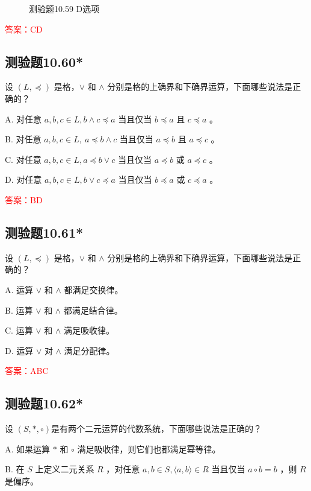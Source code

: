 \documentclass[UTF8, heading=true]{ctexart}
\begin{document}
\begin{figure}[H]
\begin{minipage}[t]{0.2\textwidth}
      \vspace{-0.3cm}
      \caption{测验题10.59 D选项}
\end{minipage}
\end{figure}

\textcolor{red}{答案：CD}


\subsection{测验题10.60*}

设 $(L, \preceq)$ 是格，$\vee$ 和 $\wedge$ 分别是格的上确界和下确界运算，下面哪些说法是正确的？

A. 对任意 $a, b, c \in L,  b \wedge c \preceq a$ 当且仅当 $b \preceq a$ 且 $c \preceq a$ 。

B. 对任意 $a, b, c \in L, ~ a \preceq b \wedge c$ 当且仅当 $a \preceq b$ 且 $a \preceq c$ 。

C. 对任意 $a, b, c \in L, a \preceq b \vee c$ 当且仅当 $a \preceq b$ 或 $a \preceq c$ 。

D. 对任意 $a, b, c \in L,  b \vee c \preceq a$ 当且仅当 $b \preceq a$ 或 $c \preceq a$ 。

\textcolor{red}{答案：BD}

\subsection{测验题10.61*}

设 $(L, \preceq)$ 是格，$\vee$ 和 $\wedge$ 分别是格的上确界和下确界运算，下面哪些说法是正确的？

A. 运算 $\vee$ 和 $\wedge$ 都满足交换律。

B. 运算 $\vee$ 和 $\wedge$ 都满足结合律。

C. 运算 $\vee$ 和 $\wedge$ 满足吸收律。

D. 运算 $\vee$ 对 $\wedge$ 满足分配律。

\textcolor{red}{答案：ABC}

\subsection{测验题10.62*}

设 $(S, *, \circ)$是有两个二元运算的代数系统，下面哪些说法是正确的？

A. 如果运算 $*$ 和 $\circ$ 满足吸收律，则它们也都满足幂等律。

B. 在 $S$ 上定义二元关系 $R$ ，对任意 $a, b \in S,\langle a, b\rangle \in R$ 当且仅当 $a \circ b=b$ ，则 $R$ 是偏序。
\end{document}
